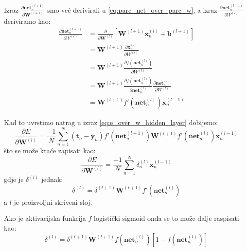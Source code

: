 \documentclass[times, utf8, diplomski, numeric]{fer}
\begin{document}
Izraz $\frac{\partial \boldsymbol{net}_n^{(l+1)}}{\partial \boldsymbol{W}^{(l+1)}}$ smo već derivirali u \ref{eq:parc_net_over_parc_w}, a izraz $\frac{\partial \boldsymbol{net}_n^{(l+1)}}{\partial W^{(l)}}$ deriviramo kao:
\begin{equation} %
\begin{split}
  \frac{\partial \boldsymbol{net}_n^{(l+1)}}{\partial W^{(l)}}
    &= \frac{\partial}{\partial \boldsymbol{W}^{(l)}} \left[ \boldsymbol{W}^{(l+1)} \boldsymbol{x}_n^{(l)} + \boldsymbol{b}^{(l+1)} \right] \\
    &= \boldsymbol{W}^{(l+1)} \frac{\partial \boldsymbol{x}_n^{(l)}}{\partial W^{(l)}} \\
    &= \boldsymbol{W}^{(l+1)} \frac{\partial f \left( \boldsymbol{net}_n^{(l)} \right) }{\partial W^{(l)}} \\
    &= \boldsymbol{W}^{(l+1)} \frac{\partial f \left( \boldsymbol{net}_n^{(l)} \right)}{\partial \boldsymbol{net}_n^{(l)}} \frac{\partial \boldsymbol{net}_n^{(l)}}{\partial W^{(l)}} \\
    &= \boldsymbol{W}^{(l+1)} f'\left(\boldsymbol{net}_n^{(l)}\right) \boldsymbol{x}_n^{(l-1)}
\end{split}
\end{equation}

Kad to uvrstimo natrag u izraz \ref{eq:e_over_w_hidden_layer} dobijemo:
\begin{equation}
  \frac{\partial E}{\partial \boldsymbol{W}^{(l)}}
    = \frac{-1}{N} \sum_{n=1}^{N} \left( \boldsymbol{t}_{n} - \boldsymbol{y}_{n} \right) f'\left(\boldsymbol{net}_n^{(l+1)}\right) \boldsymbol{W}^{(l+1)} f'\left(\boldsymbol{net}_n^{(l)}\right) \boldsymbol{x}_n^{(l-1)}
\end{equation}
što se može kraće zapisati kao:
\begin{equation}
  \frac{\partial E}{\partial \boldsymbol{W}^{(l)}}
    = \frac{-1}{N} \sum_{n=1}^{N} \delta_n^{(l)} \boldsymbol{x}_n^{(l-1)}
\end{equation}
gdje je $\delta^{(l)}$ jednak:
\begin{equation} %
\label{eq:delta_hiddenlayer}
  \delta^{(l)}
    = \delta^{(l+1)} \boldsymbol{W}^{(l+1)} f'\left(\boldsymbol{net}_n^{(l)}\right)
\end{equation}
a $l$ je proizvoljni skriveni sloj.

Ako je aktivacijska funkcija $f$ logistički sigmoid onda se to može dalje raspisati kao:
\begin{equation}
  \delta^{(l)}
    = \delta^{(l+1)} \boldsymbol{W}^{(l+1)} f\left(\boldsymbol{net}_n^{(l)}\right) \left[ 1 - f\left(\boldsymbol{net}_n^{(l)}\right) \right]
\end{equation}
\end{document}
